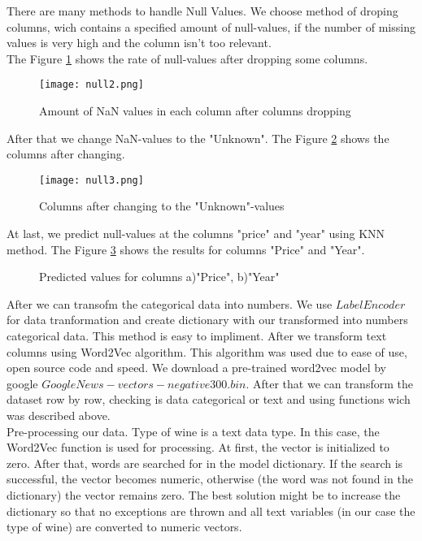 \documentclass[a4paper, twoside, english]{article}
\begin{document}
There are many methods to handle Null Values. We choose method of droping columns, wich contains a specified amount of null-values, if the number of missing values is very high and the column isn't too relevant. \\
The Figure \ref{fig:null2} shows the rate of null-values after dropping some columns.\\
\begin{figure}[h!]
	\centerline{\texttt{[image: null2.png]}}
	\caption[null]{Amount of NaN values in each column after columns dropping}
	\label{fig:null2}
\end{figure}
\newpage
After that we change NaN-values to the "Unknown". The Figure \ref{fig:null3} shows the columns after changing.\\
\begin{figure}[h!]
	\centerline{\texttt{[image: null3.png]}}
	\caption[null]{Columns after changing to the "Unknown"-values}
	\label{fig:null3}
\end{figure}

At last, we predict  null-values at the columns "price" and "year" using KNN method. The Figure \ref{fig:null45} shows the results for columns "Price" and "Year".\\
 \begin{figure}[h!]
	\centerline
	{
		\qquad
	}
	\caption[null]{Predicted values for columns a)"Price", b)"Year"}
	\label{fig:null45}
\end{figure}
\newpage
After we can transofm the categorical data into numbers. We use $LabelEncoder$ for data tranformation and create dictionary with our transformed into numbers categorical data. This method is easy to impliment. After we transform text columns using Word2Vec algorithm. This algorithm was used due to ease of use, open source code and speed. We download a pre-trained word2vec model by google $GoogleNews-vectors-negative300.bin$. After that we can transform the dataset row by row, checking is data categorical or text and using functions wich was described above.\\

Pre-processing our data. Type of wine is a text data type. In this case, the Word2Vec function is used for processing. At first, the vector is initialized to zero. After that, words are searched for in the model dictionary. If the search is successful, the vector becomes numeric, otherwise (the word was not found in the dictionary) the vector remains zero. The best solution might be to increase the dictionary so that no exceptions are thrown and all text variables (in our case the type of wine) are converted to numeric vectors.\\
\end{document}
